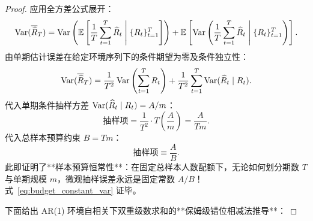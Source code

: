 \begin{proof}
应用全方差公式展开：
\begin{equation}
\operatorname{Var}(\overline{\widehat{R}}_T) = \operatorname{Var}\left( \operatorname{\mathbb{E}}\left[ \frac{1}{T}\sum_{t=1}^T \widehat{R}_t \;\middle|\; \{R_t\}_{t=1}^T \right] \right) + \operatorname{\mathbb{E}}\left[ \operatorname{Var}\left( \frac{1}{T}\sum_{t=1}^T \widehat{R}_t \;\middle|\; \{R_t\}_{t=1}^T \right) \right].
\end{equation}
由单期估计误差在给定环境序列下的条件期望为零及条件独立性：
\begin{equation}
\operatorname{Var}(\overline{\widehat{R}}_T) = \frac{1}{T^2} \operatorname{Var}\left( \sum_{t=1}^T R_t \right) + \frac{1}{T^2} \sum_{t=1}^T \operatorname{Var}(\widehat{R}_t \mid R_t).
\end{equation}
代入单期条件抽样方差 $\operatorname{Var}(\widehat{R}_t \mid R_t) = A/m$：
\begin{equation}
\text{抽样项} = \frac{1}{T^2} \cdot T \left( \frac{A}{m} \right) = \frac{A}{T m}.
\end{equation}
代入总样本预算约束 $B = T m$：
\begin{equation}
\text{抽样项} \equiv \frac{A}{B}.
\end{equation}
此即证明了**样本预算恒常性**：在固定总样本人数配额下，无论如何划分期数 $T$ 与单期规模 $m$，微观抽样误差永远是固定常数 $A/B$！式~\eqref{eq:budget_constant_var} 证毕。

下面给出 AR(1) 环境自相关下双重级数求和的**保姆级错位相减法推导**：


\end{proof}
